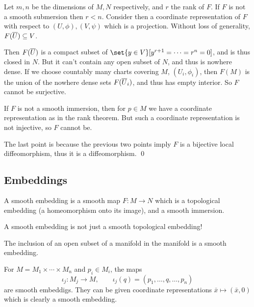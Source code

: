 \ethrm

\bproof

    Let $m,n$ be the dimensions of $M,N$ respectively, and $r$ the rank of $F$.
    If $F$ is not a smooth submersion then $r<n$.
    Consider then a coordinate representation of $F$ with respect to $(U,\phi),(V,\psi)$ which is a projection.
    Without loss of generality, $F(\overline U)\subseteq V$.

    Then $F(\overline U)$ is a compact subset of $\set{y\in V}[y^{r+1}=\cdots=r^n=0]$, and is thus closed in $N$.
    But it can't contain any open subset of $N$, and thus is nowhere dense.
    If we choose countably many charts covering $M$, $(U_i,\phi_i)$, then $F(M)$ is the union of the nowhere dense sets
    $F(\overline U_i)$, and thus has empty interior.
    So $F$ cannot be surjective.

    If $F$ is not a smooth immersion, then for $p\in M$ we have a coordinate representation as in the rank theorem.
    But such a coordinate representation is not injective, so $F$ cannot be.

    The last point is because the previous two points imply $F$ is a bijective local diffeomorphism, thus it is a
    diffeomorphism.
    \qed

\eproof

\subsection{Embeddings}

\bdefn

    A {\emphcolor smooth embedding} is a smooth map $F\colon M\to N$ which is a topological embedding (a homeomorphism onto
    its image), and a smooth immersion.

\edefn

A smooth embedding is not just a smooth topological embedding!

\bexam

    The inclusion of an open subset of a manifold in the manifold is a smooth embedding.

\eexam

\bexam

    For $M=M_1\times\cdots\times M_n$ and $p_i\in M_i$, the maps
    $$ \iota_j \colon M_j\to M,\qquad \iota_j(q) = (p_1,\dots,q,\dots,p_n) $$
    are smooth embeddigs.
    They can be given coordinate representations $\bar x\mapsto(\bar x,0)$ which is clearly a smooth embedding.

\eexam

